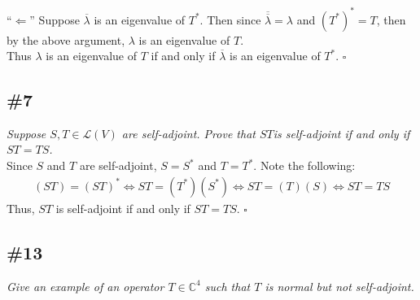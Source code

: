 \documentclass[12pt]{article}
\begin{document}
\noindent ``$\Longleftarrow$''
Suppose $\overline{\lambda}$ is an eigenvalue of $T^*$.  Then since $\overline{\overline{\lambda}} = \lambda$ and $(T^*)^* = T$, then by the above argument, $\lambda$ is an eigenvalue of $T$. \\

\noindent Thus $\lambda$ is an eigenvalue of $T$ if and only if $\overline{\lambda}$ is an eigenvalue of $T^*$. \hfill $\square$

\subsection*{\#7}
{\it Suppose $S, T \in \mathcal{L}(V)$ are self-adjoint.  Prove that $ST$is self-adjoint if and only if $ST = TS$.} \\

\noindent Since $S$ and $T$ are self-adjoint, $S = S^*$ and $T = T^*$.  Note the following:
\begin{align*}
	(ST) = (ST)^* \iff ST = (T^*)(S^*) \iff ST = (T)(S)	\iff ST = TS
\end{align*}
Thus, $ST$ is self-adjoint if and only if $ST = TS$. \hfill $\square$

\subsection*{\#13}
{\it Give an example of an operator $T \in \mathcal{\mathbb{C}^4}$ such that $T$ is normal but not self-adjoint.} \\
\end{document}
